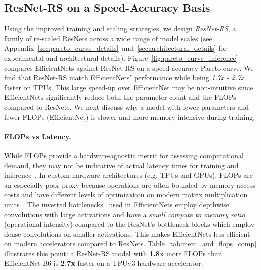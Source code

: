 \documentclass{article}
\begin{document}
\subsection{ResNet-RS on a Speed-Accuracy Basis\label{sec:resnet_rs_speed}}
Using the improved training and scaling strategies, we design \emph{ResNet-RS}, a family of re-scaled ResNets across a wide range of model scales (see Appendix~\ref{sec:pareto_curve_details}~and~\ref{sec:architectural_details} for experimental and architectural details).
Figure~\ref{fig:pareto_curve_inference} compares EfficientNets against ResNet-RS on a speed-accuracy Pareto curve.
We find that ResNet-RS match EfficientNets' performance while being \emph{1.7x - 2.7x} faster on TPUs.
This large speed-up over EfficientNet may be non-intuitive since EfficientNets significantly reduce both the parameter count and the FLOPs compared to ResNets.
We next discuss why a model with fewer parameters and fewer FLOPs (EfficientNet) is slower and more memory-intensive during training.

\paragraph{FLOPs vs Latency.}
While FLOPs provide a hardware-agnostic metric for assessing computational demand, they may not be indicative of actual latency times for training and inference~\cite{howard2017mobilenets,howard2019searching,radosavovic2020designing}.
In custom hardware architectures (e.g. TPUs and GPUs), FLOPs are an especially poor proxy because operations are often bounded by memory access costs and have different levels of optimization on modern matrix multiplication units~\cite{jouppi2017datacenter}.
The inverted bottlenecks~\cite{sandler2018mobilenetv2} used in EfficientNets employ depthwise convolutions with large activations and have a \emph{small compute to memory ratio} (operational intensity) compared to the ResNet's bottleneck blocks which employ dense convolutions on smaller activations.
This makes EfficientNets less efficient on modern accelerators compared to ResNets.
Table~\ref{tab:mem_and_flops_comp} illustrates this point: a ResNet-RS model with \textbf{1.8x} more FLOPs than EfficientNet-B6 is \textbf{2.7x} faster on a TPUv3 hardware accelerator.
\end{document}
